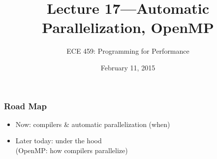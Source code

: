 \documentclass[aspectratio=43]{beamer}
\title{Lecture 17---Automatic Parallelization, OpenMP}
\subtitle{ECE 459: Programming for Performance}
\date{February 11, 2015}
\newenvironment{changemargin}[1]{%
  \begin{list}{}{%
    \setlength{\topsep}{0pt}%
    \setlength{\leftmargin}{#1}%
    \setlength{\rightmargin}{1em}
    \setlength{\listparindent}{\parindent}%
    \setlength{\itemindent}{\parindent}%
    \setlength{\parsep}{\parskip}%
  }%
  \item[]}{\end{list}}
\begin{document}
\begin{frame}[plain]
  \titlepage
\end{frame}

\begin{frame}
  \frametitle{Road Map}

  \begin{changemargin}{1cm}
    \begin{itemize}
    \item Now: compilers \& automatic parallelization (when)
    \item Later today: under the hood\\
      \hspace*{2cm}(OpenMP: how compilers parallelize)
    \end{itemize}
  \end{changemargin}
\end{frame}
\end{document}
